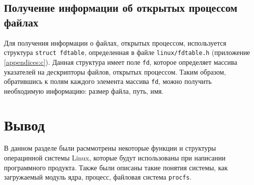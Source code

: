 \subsection{Получение информации об открытых процессом файлах}

Для получения информации о файлах, открытых процессом, используется структура \texttt{struct fdtable}, определенная в файле \texttt{linux/fdtable.h} (приложение \ref{appendices:c}). Данная структура имеет поле \texttt{fd}, которое определяет массива указателей на дескрипторы файлов, открытых процессом. Таким образом, обратившись к полям каждого элемента массива \texttt{fd}, можно получить необходимую информацию: размер файла, путь, имя.


\section*{Вывод}

В данном разделе были расммотрены некоторые функции и структуры операцинной системы Linux, которые будут использованы при написании программного продукта. Также были описаны такие понятия системы, как загружаемый модуль ядра, процесс, файловая система \texttt{procfs}.
